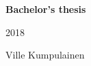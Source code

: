 \begin{titlepage}

    \vspace*{10em}
    \centering
    {\Huge\bfseries Bachelor's thesis\par}
    {\huge2018\par}
    \vfill

    \begin{minipage}{10cm}
    \begin{flushright}
        \Large
        Ville Kumpulainen
        \par
    \end{flushright}
    \end{minipage}

\end{titlepage}
